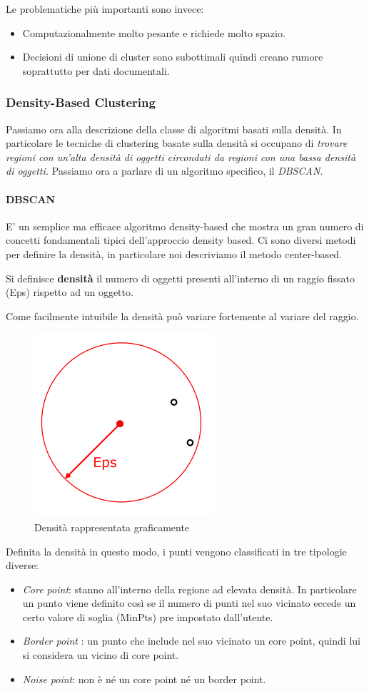 Le problematiche più importanti sono invece:
\begin{itemize}
	\item Computazionalmente molto pesante e richiede molto spazio.
	\item Decisioni di unione di cluster sono subottimali quindi creano rumore soprattutto per dati documentali. 
\end{itemize}

\subsubsection{Density-Based Clustering}
Passiamo ora alla descrizione della classe di algoritmi basati sulla densità. In particolare le tecniche di clustering basate sulla densità si occupano di \textit{trovare regioni con un'alta densità di oggetti circondati da regioni con una bassa densità di oggetti.}
Passiamo ora a parlare di un algoritmo specifico, il \textit{DBSCAN.}

\paragraph{DBSCAN} E' un semplice ma efficace  algoritmo density-based che mostra un gran numero di concetti fondamentali tipici dell'approccio density based. Ci sono diversi metodi per definire la densità, in particolare noi descriviamo il metodo center-based.
\begin{defn}
	Si definisce \textbf{densità} il numero di oggetti presenti all'interno di un raggio fissato (Eps) rispetto ad un oggetto.
\end{defn} 

Come facilmente intuibile la densità può variare fortemente al variare del raggio.
\begin{figure}[H]
	\centering
	\includegraphics[height=0.25 \linewidth]{clustering/pict/density.png}
	\caption{Densità rappresentata graficamente}
\end{figure}

Definita la densità in questo modo, i punti vengono classificati in tre tipologie diverse:
\begin{itemize}
	\item \textit{Core point}: stanno all'interno della regione ad elevata densità. In particolare un punto viene definito così se il numero di punti nel suo vicinato eccede un certo valore di soglia (MinPts) pre impostato dall'utente. 
	\item \textit{Border point} : un punto che include nel suo vicinato un core point, quindi lui si considera un vicino di core point.
	\item \textit{Noise point}: non è né un core point né un border point.
\end{itemize}

